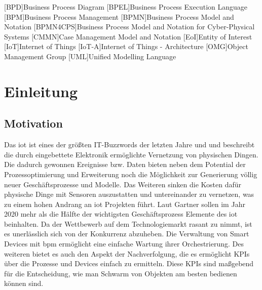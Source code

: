 \documentclass[a4paper, 12pt, twoside, headsepline=true]{scrartcl} %
\begin{document}
\tableofcontents
\clearpage
\newpage


\begin{acronym}[header=Abkürzungsverzeichnis]
	[BPD]{Business Process Diagram}
	[BPEL]{Business Process Execution Language}
	[BPM]{Business Process Management}
	[BPMN]{Business Process Model and Notation}
	[BPMN4CPS]{Business Process Model and Notation for Cyber-Physical Systems}
	[CMMN]{Case Management Model and Notation}
	[EoI]{Entity of Interest}
	[IoT]{Internet of Things}
	[IoT-A]{Internet of Things - Architecture}
	[OMG]{Object Management Group}
	[UML]{Unified Modelling Language}
\end{acronym}

\clearpage


\listoftables

\clearpage

\listoffigures
\clearpage


\section{Einleitung} \label{sec:section}

\subsection{Motivation} \label{sec:subsection}
Das \ac{iot} ist eines der größten IT-Buzzwords der letzten Jahre und und beschreibt die durch eingebettete Elektronik ermöglichte Vernetzung von physischen Dingen. Die dadurch gewonnen Ereignisse bzw. Daten bieten neben dem Potential der
Prozessoptimierung und Erweiterung noch die Möglichkeit zur Generierung völlig neuer Geschäftsprozesse und Modelle. 
Das Weiteren sinken die Kosten dafür physische Dinge mit Sensoren auszustatten und untereinander zu vernetzen, was zu einem hohen Andrang an \ac{iot} Projekten führt. Laut Gartner sollen im Jahr 2020 mehr als die Hälfte der wichtigsten Geschäftsprozess Elemente des \ac{iot} beinhalten.
 Da der Wettbewerb auf dem Technologiemarkt rasant zu nimmt, ist es unerlässlich  sich von der Konkurrenz abzuheben. Die Verwaltung von Smart Devices mit \ac{bpm} ermöglicht eine einfache Wartung ihrer Orchestrierung. Des weiteren bietet es auch den Aspekt der Nachverfolgung, die es ermöglicht KPIs über die Prozesse und Devices einfach zu ermitteln. Diese KPIs sind maßgebend für die Entscheidung, wie man Schwarm von Objekten am besten bedienen können sind.
\end{document}

